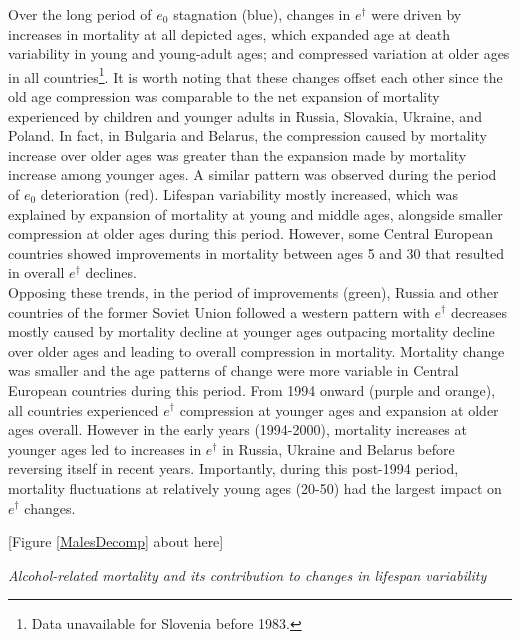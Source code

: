 \documentclass{article}
\begin{document}
\begin{spacing}{1.5}
Over the long period of $e_0$ stagnation (blue), changes in $e^\dagger$ were driven by increases in mortality at all depicted ages, which expanded age at death variability in young and young-adult ages; and compressed variation at older ages in all countries\footnote{Data unavailable for Slovenia before 1983.}. It is worth noting that these changes offset each other since the old age compression was comparable to the net expansion of mortality experienced by children and younger adults in Russia, Slovakia, Ukraine, and Poland. In fact, in Bulgaria and Belarus, the compression caused by mortality increase over older ages was greater than the expansion made by mortality increase among younger ages. A similar pattern was observed during the period of $e_0$ deterioration (red). Lifespan variability mostly increased, which was explained by expansion of mortality at young and middle ages, alongside smaller compression at older ages during this period.  However, some Central European countries showed improvements in mortality between ages 5 and 30 that resulted in overall $e^\dagger$ declines.\\

Opposing these trends, in the period of improvements (green), Russia and other countries of the former Soviet Union followed a western pattern with $e^\dagger$ decreases mostly caused by mortality decline at younger ages outpacing mortality decline over older ages and leading to overall compression in mortality. Mortality change was smaller and the age patterns of change were more variable in Central European countries during this period. From 1994 onward (purple and orange), all countries experienced $e^\dagger$ compression at younger ages and expansion at older ages overall. However in the early years (1994-2000), mortality increases at younger ages led to increases in $e^\dagger$ in Russia, Ukraine and Belarus before reversing itself in recent years. Importantly, during this post-1994 period, mortality fluctuations at relatively young ages (20-50) had the largest impact on $e^\dagger$ changes.\\



\begin{center}
[Figure \ref{MalesDecomp} about here]\\
\end{center}

\emph{Alcohol-related mortality and its contribution to changes in lifespan variability}\\


\end{spacing}
\end{document}
